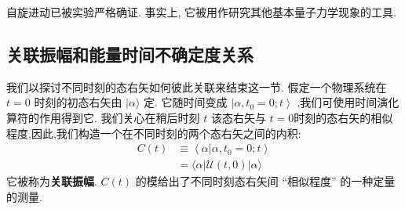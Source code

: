 自旋进动已被实验严格确证. 事实上, 它被用作研究其他基本量子力学现象的工具. 
\subsection{关联振幅和能量时间不确定度关系}
我们以探讨不同时刻的态右矢如何彼此关联来结束这一节. 假定一个物理系统在 $t = 0$ 时刻的初态右矢由 $|\alpha \rangle$ 定. 它随时间变成 $\left| {\alpha ,{t}_{0} = 0;t}\right\rangle$ ,我们可使用时间演化算符的作用得到它. 我们关心在稍后时刻 $t$ 该态右矢与 $t = 0$时刻的态右矢的相似程度,因此,我们构造一个在不同时刻的两个态右矢之间的内积:
\begin{equation}
	\begin{aligned}
		C\left( t\right) &\equiv \left\langle {\alpha | \alpha ,{t}_{0} = 0;t}\right\rangle\\
		&= \langle \alpha \left| {\mathcal{U}\left( {t,0}\right) }\right| \alpha \rangle
	\end{aligned}
\end{equation}
它被称为\textbf{关联振幅}. $C\left( t\right)$ 的模给出了不同时刻态右矢间 “相似程度” 的一种定量的测量.


